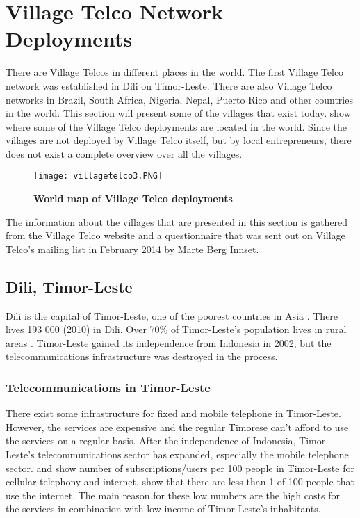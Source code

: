 \section{Village Telco Network Deployments} \label{sec:deployments}
There are Village Telcos in different places in the world. The first Village Telco network was established in Dili on Timor-Leste. There are also Village Telco networks in Brazil, South Africa, Nigeria, Nepal, Puerto Rico and other countries in the world. This section will present some of the villages that exist today.  show where some of the Village Telco deployments are located in the world. Since the villages are not deployed by Village Telco itself, but by local entrepreneurs, there does not exist a complete overview over all the villages. 


\begin{figure}[H]
\centering
\texttt{[image: villagetelco3.PNG]}
\caption [World map of Village Telco deployments]{\textbf{World map of Village Telco deployments}}
\label{fig:mapdeployments}
\end{figure}

The information about the villages that are presented in this section is gathered from the Village Telco website \cite{villagetelcodeployments} and a questionnaire that was sent out on Village Telco's mailing list in February 2014 by Marte Berg Innset.

\subsection{Dili, Timor-Leste}\label{sec:timor}
Dili is the capital of Timor-Leste, one of the poorest countries in Asia \cite{vtdili}. There lives 193 000 (2010) in Dili. Over 70\% of Timor-Leste's population lives in rural areas \cite{quandltimor}.  Timor-Leste gained its independence from Indonesia in 2002, but the telecommunications infrastructure was destroyed in the process. 


\subsubsection{Telecommunications in Timor-Leste}
There exist some infrastructure for fixed and mobile telephone in Timor-Leste. However, the services are expensive and the regular Timorese can't afford to use the services on a regular basis. After the independence of Indonesia, Timor-Leste's telecommunications sector has expanded, especially the mobile telephone sector.  and  show number of subscriptions/users per 100 people in Timor-Leste for cellular telephony and internet.  show that there are less than 1 of 100 people that use the internet. The main reason for these low numbers are the high costs for the services in combination with low income of Timor-Leste's inhabitants. 


